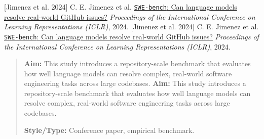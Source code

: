 \documentclass[11pt, a4paper]{article}
\begin{document}
\newpage
\noindent \hypertarget{p2}{[Jimenez et al. 2024]} C. E. Jimenez et al. \href{https://arxiv.org/abs/2310.06770}{\texttt{SWE-bench}: Can language models resolve real-world GitHub issues?} \textit{Proceedings of the International Conference on Learning Representations (ICLR)}, 2024.
\noindent \hypertarget{p2}{[Jimenez et al. 2024]} C. E. Jimenez et al. \href{https://arxiv.org/abs/2310.06770}{\texttt{SWE-bench}: Can language models resolve real-world GitHub issues?} \textit{Proceedings of the International Conference on Learning Representations (ICLR)}, 2024.
\begin{quote}
\textbf{Aim:} This study introduces a repository-scale benchmark that evaluates how well language models can resolve complex, real-world software engineering tasks across large codebases.
\textbf{Aim:} This study introduces a repository-scale benchmark that evaluates how well language models can resolve complex, real-world software engineering tasks across large codebases.

\vspace{0.5em}
\textbf{Style/Type:} Conference paper, empirical benchmark.


\end{quote}
\end{document}

